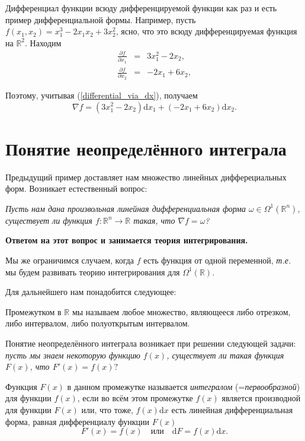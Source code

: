 \begin{example}
    Дифференциал функции всюду дифференцируемой функции как раз и есть пример дифференциальной формы. Например, пусть $f(x_1,x_2) = x_1^3 - 2x_1x_2 + 3x_2^2$, ясно, что это всюду дифференцируемая функция на $\mathbb{R}^2$. Находим
 \begin{eqnarray*}
   \frac{\partial f}{\partial x_1} &=& 3x_1^2 - 2x_2, \\
   \frac{\partial f}{\partial x_2} &=&  - 2x_1 + 6x_2,
 \end{eqnarray*}

Поэтому, учитывая (\ref{differential_via_dx}), получаем
\[
 \nabla f = (3x_1^2-2x_2)\mathrm{d}x_1 + (-2x_1 + 6x_2) \mathrm{d}x_2.
\]
    
\end{example}




\section{Понятие неопределённого интеграла}

Предыдущий пример доставляет нам множество линейных дифферециальных форм. Возникает естественный вопрос:~

\textit{Пусть нам дана произвольная линейная дифференциальная форма $\omega \in \Omega^1(\mathbb{R}^n)$, существует ли функция $f:\mathbb{R}^n \to \mathbb{R}$ такая, что $\nabla f = \omega$?}

\textbf{Ответом на этот вопрос и занимается теория интегрирования.}

Мы же ограничимся случаем, когда $f$ есть функция от одной переменной, \textit{т.е.} мы будем развивать теорию интегрирования для $\Omega^1(\mathbb{R}).$

Для дальнейшего нам понадобится следующее: 
\begin{definition}
    Промежутком в $\mathbb{R}$ мы называем любое множество, являющееся либо отрезком, либо интервалом, либо полуоткрытым интервалом.
\end{definition}

Понятие неопределённого интеграла возникает при решении следующей задачи:
\textit{пусть мы знаем некоторую функцию $f(x)$, существует ли такая функция $F(x)$, что $F'(x) =f(x)?$}

\begin{definition}\label{int1}
    Функция $F(x)$ в данном промежутке называется \textit{интегралом} (=\textit{первообразной}) для функции $f(x)$, если во всём этом промежутке $f(x)$ является производной для функции $F(x)$ или, что тоже, $f(x)\mathrm{d}x$ есть линейная дифференциальная форма, равная дифференциалу функции $F(x)$
    \[
     F'(x) = f(x) \quad \mbox{или} \quad  \mathrm{d}F = f(x) \mathrm{d}x.
    \]
\end{definition}

